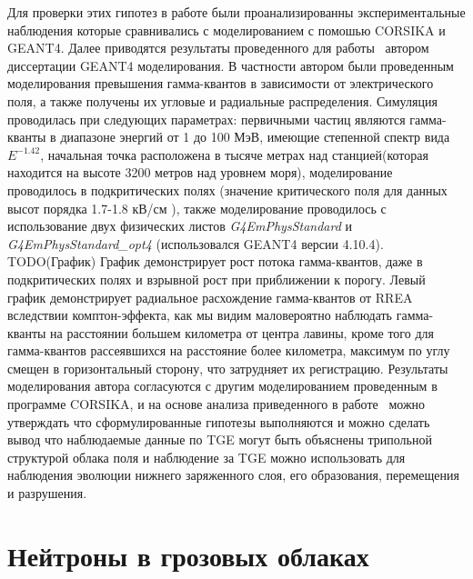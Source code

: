 Для проверки этих гипотез в работе были проанализированны экспериментальные наблюдения которые сравнивались с моделированием с помошью CORSIKA и GEANT4. Далее приводятся результаты проведенного для работы~\cite{PhysRevD.98.082001}  автором диссертации GEANT4 моделирования. В частности автором были проведенным моделирования превышения гамма-квантов в зависимости от электрического поля, а также получены их угловые и радиальные распределения. Симуляция проводилась при следующих параметрах: первичными частиц являются гамма-кванты в диапазоне энергий от 1 до 100 МэВ, имеющие степенной спектр вида $E^{-1.42}$, начальная точка расположена в тысяче метрах над станцией(которая находится на высоте 3200 метров над уровнем моря), моделирование проводилось в подкритических полях (значение критического поля для данных высот порядка 1.7-1.8 кВ/см
), также моделирование проводилось с использование двух физических листов \textit{G4EmPhysStandard} и \textit{G4EmPhysStandard\_opt4} (использовался GEANT4 версии 4.10.4). TODO(График) График демонстрирует рост потока гамма-квантов, даже в подкритических полях и взрывной рост при приближении к порогу. Левый график демонстрирует радиальное расхождение гамма-квантов от RREA вследствии комптон-эффекта, как мы видим маловероятно наблюдать гамма-кванты на расстоянии большем километра от центра лавины, кроме того для гамма-квантов рассеявшихся на расстояние более километра, максимум по углу смещен в горизонтальный сторону, что затрудняет их регистрацию. Результаты моделирования автора согласуются с другим моделированием проведенным в программе CORSIKA, и на основе анализа приведенного в работе~\cite{PhysRevD.98.082001} можно утверждать что сформулированные гипотезы выполняются и можно сделать вывод что наблюдаемые данные по TGE могут быть объяснены трипольной структурой облака поля и наблюдение за TGE можно использовать для наблюдения эволюции нижнего заряженного слоя, его образования, перемещения и разрушения.

\section{Нейтроны в грозовых облаках}\label{sec:thunderstorm/neutron} 

